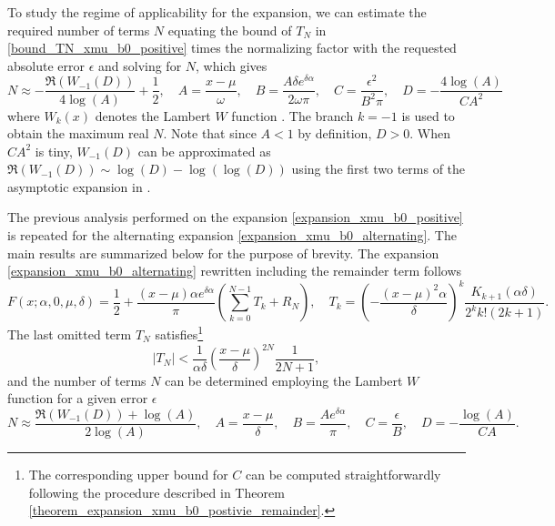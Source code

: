 \documentclass[10pt,a4paper,oneside]{article}
\numberwithin{equation}{section}
\begin{document}
To study the regime of applicability for the expansion, we can estimate the required number of terms $N$ equating the bound of $T_N$ in \eqref{bound_TN_xmu_b0_positive} times the normalizing factor with the requested absolute error $\epsilon$ and solving for $N$, which gives
\begin{equation}\label{N_expansion_xmu_b0_positive}
N \approx -\frac{\Re(W_{-1}(D))}{4 \log(A)} + \frac{1}{2}, \quad A = \frac{x-\mu}{\omega}, \quad B = \frac{A\delta e^{\delta \alpha}}{2\omega\pi}, \quad C = \frac{\epsilon^2}{B^2 \pi}, \quad D = -\frac{4 \log(A)}{C A^2}
\end{equation}
where $W_k(x)$ denotes the Lambert $W$ function \cite[\S 4.13]{NIST:DLMF}. The branch $k=-1$ is used to obtain the maximum real $N$. Note that since $A < 1$ by definition, $D > 0$. When $C A^2$ is tiny, $W_{-1}(D)$ can be approximated as $\Re(W_{-1}(D)) \sim \log(D) - \log(\log(D))$ using the first two terms of the asymptotic expansion in \cite[\S 4.13.10]{NIST:DLMF}.

The previous analysis performed on the expansion \eqref{expansion_xmu_b0_positive} is repeated for the alternating expansion \eqref{expansion_xmu_b0_alternating}. The main results are summarized below for the purpose of brevity. The expansion \eqref{expansion_xmu_b0_alternating} rewritten including the remainder term follows
\begin{equation}
F(x; \alpha, 0, \mu, \delta) = \frac{1}{2} + \frac{(x-\mu)\alpha e^{\delta \alpha}}{\pi} \left( \sum_{k=0}^{N-1} T_k + R_N\right),  \quad T_k = \left(-\frac{(x-\mu)^2 \alpha}{\delta}\right)^k \frac{K_{k+1}(\alpha \delta)}{2^k k! (2k + 1)}.
\end{equation}
The last omitted term $T_N$ satisfies\footnote{The corresponding upper bound for $C$ can be computed straightforwardly following the procedure described in Theorem \ref{theorem_expansion_xmu_b0_postivie_remainder}.}
\begin{equation}
|T_N| < \frac{1}{\alpha \delta} \left(\frac{x-\mu}{\delta}\right)^{2N} \frac{1}{2N + 1},
\end{equation} 
and the number of terms $N$ can be determined employing the Lambert $W$ function for a given error $\epsilon$
\begin{equation}
N \approx \frac{\Re(W_{-1}(D)) + \log(A)}{2 \log(A)}, \quad A = \frac{x-\mu}{\delta}, \quad B = \frac{A e^{\delta \alpha}}{\pi}, \quad C = \frac{\epsilon}{B}, \quad D = -\frac{\log(A)}{CA}.
\end{equation}
\end{document}
